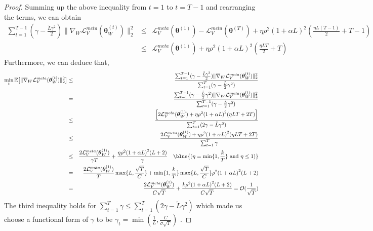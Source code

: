 \begin{proof}
Summing up the above inequality from $t=1$ to $t=T-1$ and rearranging the terms, we can obtain
\begin{eqnarray}
    \sum_{t=1}^{T-1} (\gamma -\frac{\tilde{L}\gamma^2}{2}) \| \nabla_W \mathcal{L}^{meta}_V(\boldsymbol{\theta}_W^{(t)})\|^2_2 &\le& 
    \mathcal{L}_V^{meta}(\boldsymbol{\theta}^{(1)}) - \mathcal{L}_V^{meta}(\boldsymbol{\theta}^{(T)}) + \eta {\rho}^2{(1+\alpha L)}^2(\frac{\eta L(T-1)}{2}+T-1) \nonumber \\
    &\le& \mathcal{L}_V^{meta}(\boldsymbol{\theta}^{(1)}) + \eta {\rho}^2{(1+\alpha L)}^2(\frac{\eta LT}{2}+T)
\end{eqnarray}
Furthermore, we can deduce that,
\begin{eqnarray}
    \min_t \mathbb{E}\big[ \| \nabla_W  \mathcal{L}_V^{meta}(\boldsymbol{\theta}_W^{(t)})\|^2_2 \big] &\le&  \frac{ \sum_{t=1}^{T-1} (\gamma -\frac{\tilde{L}\gamma^2}{2}) \| \nabla_W  \mathcal{L}_V^{meta}(\boldsymbol{\theta}_W^{(t)})\|^2_2 }{ \sum_{t=1}^T (\gamma -\frac{\tilde{L}}{2}\gamma^2) } \nonumber \\
    &=&  \frac{ \sum_{t=1}^{T-1} (\gamma -\frac{\tilde{L}}{2}\gamma^2) \| \nabla_W  \mathcal{L}_V^{meta}(\boldsymbol{\theta}_W^{(t)})\|^2_2 }{ \sum_{t=1}^{T-1} (\gamma -\frac{\tilde{L}}{2}\gamma^2) } \nonumber \\
     &\leq&  \frac{\Big[  2\mathcal{L}_V^{meta}(\boldsymbol{\theta}_W^{(1)}) + \eta {\rho}^2{(1+\alpha L)}^2(\eta LT + 2T) \Big]}{ \sum_{t=1}^T (2\gamma -\tilde{L}\gamma^2) } \nonumber \\
      &\leq&  \frac{2\mathcal{L}_V^{meta}(\boldsymbol{\theta}_W^{(1)}) + \eta {\rho}^2{(1+\alpha L)}^2(\eta LT + 2T)}{ \sum_{t=1}^T \gamma} \nonumber \\
      &\leq& \frac{ 2\mathcal{L}_V^{meta}(\boldsymbol{\theta}_W^{(1)})}{\gamma T} + \frac{\eta {\rho}^2{(1+\alpha L)}^2( L+2)}{\gamma} \quad \blue{(\eta = \min\{1, \frac{k}{T}\} \text{ and } \eta\leq1)} \nonumber \\
      &=& \frac{ 2\mathcal{L}_V^{meta}(\boldsymbol{\theta}_W^{(1)})}{T}\max\{L, \frac{\sqrt{T}}{C}\} + \min\{1, \frac{k}{T}\} \max\{L, \frac{\sqrt{T}}{C}\}{\rho}^2{(1+\alpha L)}^2 ( L+2)\nonumber \\
      &=& \frac{ 2\mathcal{L}_V^{meta}(\boldsymbol{\theta}_W^{(1)})}{C\sqrt{T}} + \frac{k{\rho}^2{(1+\alpha L)}^2 ( L+2)}{C\sqrt{T}} = \mathcal{O}(\frac{1}{\sqrt{T}})
\end{eqnarray}
The third inequality holds for $ \sum_{t=1}^T \gamma \le \sum_{t=1}^T (2\gamma -\tilde{L}\gamma^2)$ which made us choose a functional form of $\gamma$ to be $\gamma_t = \min{(\frac{1}{L}, \frac{C}{\sigma \sqrt{T}})}$ . 


\end{proof}
